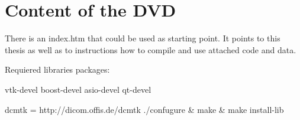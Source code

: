 \chapter{Content of the DVD}

There is an index.htm that could be used as starting point. It points to this
thesis as well as to instructions how to compile and use attached code and data.


Requiered libraries packages:


vtk-devel boost-devel asio-devel qt-devel

dcmtk = http://dicom.offis.de/dcmtk ./confugure & make & make install-lib